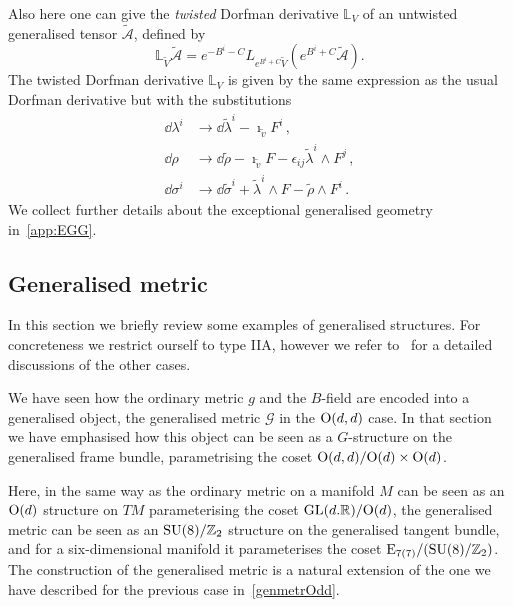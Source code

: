 \documentclass[debug]{phd}
\begin{document}
						Also here one can give the \emph{twisted} Dorfman derivative $\mathbb{L}_{V}$ of an untwisted generalised tensor $\tilde{\mathcal{A}}$, defined by
								\begin{equation}\label{eq:IIB_twisted_dorf}
									\mathbb{L}_{\tilde{V}}\tilde{\mathcal{A}}=e^{-B^{i}-C}L_{e^{B^{i}+C}\tilde{V}}(e^{B^{i}+C}\tilde{\mathcal{A}}).
								\end{equation}
						The twisted Dorfman derivative $\mathbb{L}_{V}$ is given by the same expression as the usual Dorfman derivative but with the substitutions
								\begin{equation}
									\begin{split}
										\dd\lambda^{i}	&\rightarrow	\dd\tilde{\lambda}^{i}-\imath_{\tilde{v}}F^{i} \, , \\
										\dd\rho		&\rightarrow	\dd\tilde{\rho}-\imath_{\tilde{v}}F-\epsilon_{ij}\tilde{\lambda}^{i}\wedge F^{j} \, , \\
										\dd\sigma^{i}	&\rightarrow	\dd\tilde{\sigma}^{i}+\tilde{\lambda}^{i}\wedge F-\tilde{\rho}\wedge F^{i} \, .
									\end{split}
								\end{equation}
						We collect further details about the exceptional generalised geometry in~\cref{app:EGG}.
			\subsection{Generalised metric}\label{gen_frame_metric}
					In this section we briefly review some examples of generalised structures.
					For concreteness we restrict ourself to type IIA, however we refer to~\cite{waldram4, AshmoreECY} for a detailed discussions of the other cases.
					
					We have seen how the ordinary metric $g$ and the $B$-field are encoded into a generalised object, the generalised metric $\mathcal{G}$ in the $\mathrm{O}(d,d)$ case.
					In that section we have emphasised how this object can be seen as a $G$-structure on the generalised frame bundle, parametrising the coset $\mathrm{O}(d,d)/\mathrm{O}(d) \times \mathrm{O}(d)$.
					
					Here, in the same way as the ordinary metric on a manifold $M$ can be seen as an $\mathrm{O}(d)$ structure on $T M$ parameterising the coset $\mathrm{GL}(d.\mathbb{R})/\mathrm{O}(d)$, the generalised metric can be seen as an $\mathrm{SU}(8) / \mathbb{Z}_2$ structure on the generalised tangent bundle, and for a six-dimensional manifold it parameterises the coset $\mathrm{E}_{7(7)}/(\mathrm{SU}(8) / \mathbb{Z}_2)$. 
					The construction of the generalised metric is a natural extension of the one we have described for the previous case in~\cref{genmetrOdd}.
					
\end{document}
